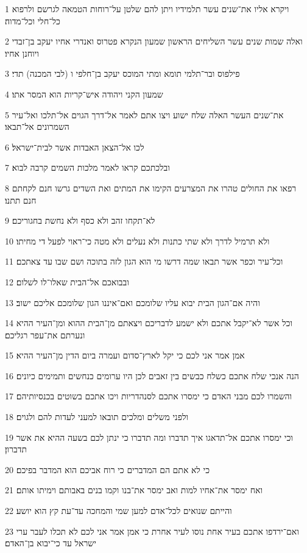 \par 1 ויקרא אליו את־שנים עשר תלמידיו ויתן להם שלטן על־רוחות הטמאה לגרשם ולרפוא כל־חלי וכל־מדוה׃
\par 2 ואלה שמות שנים עשר השליחים הראשון שמעון הנקרא פטרוס ואנדרי אחיו יעקב בן־זבדי ויוחנן אחיו׃
\par 3 פילפוס ובר־תלמי תומא ומתי המוכס יעקב בן־חלפי ו (לבי המכנה) תדי׃
\par 4 שמעון הקני ויהודה איש־קריות הוא המסר אתו׃
\par 5 את־שנים העשר האלה שלח ישוע ויצו אתם לאמר אל־דרך הגוים אל־תלכו ואל־עיר השמרונים אל־תבאו׃
\par 6 לכו אל־הצאן האבדות אשר לבית־ישראל׃
\par 7 ובלכתכם קראו לאמר מלכות השמים קרבה לבוא׃
\par 8 רפאו את החולים טהרו את המצרעים הקימו את המתים ואת השדים גרשו חנם לקחתם חנם תתנו׃
\par 9 לא־תקחו זהב ולא כסף ולא נחשת בחגוריכם׃
\par 10 ולא תרמיל לדרך ולא שתי כתנות ולא נעלים ולא מטה כי־ראוי לפעל די מחיתו׃
\par 11 וכל־עיר וכפר אשר תבאו שמה דרשו מי הוא הגון לזה בתוכה ושם שבו עד צאתכם׃
\par 12 ובבואכם אל־הבית שאלו־לו לשלום׃
\par 13 והיה אם־הגון הבית יבוא עליו שלומכם ואם־איננו הגון שלומכם אליכם ישוב׃
\par 14 וכל אשר לא־יקבל אתכם ולא ישמע לדבריכם ויצאתם מן־הבית ההוא ומן־העיר ההיא ונערתם את־עפר רגליכם׃
\par 15 אמן אמר אני לכם כי יקל לארץ־סדום ועמרה ביום הדין מן־העיר ההיא׃
\par 16 הנה אנכי שלח אתכם כשלח כבשים בין זאבים לכן היו ערומים כנחשים ותמימים כיונים׃
\par 17 והשמרו לכם מבני האדם כי ימסרו אתכם לסנהדריות ויכו אתכם בשוטים בכנסיותיהם׃
\par 18 ולפני משלים ומלכים תובאו למעני לעדות להם ולגוים׃
\par 19 וכי ימסרו אתכם אל־תדאגו איך תדברו ומה תדברו כי ינתן לכם בשעה ההיא את אשר תדברון׃
\par 20 כי לא אתם הם המדברים כי רוח אביכם הוא המדבר בפיכם׃
\par 21 ואח ימסר את־אחיו למות ואב ימסר את־בנו וקמו בנים באבותם וימיתו אותם׃
\par 22 והייתם שנואים לכל־אדם למען שמי והמחכה עד־עת קץ הוא יושע׃
\par 23 ואם־ירדפו אתכם בעיר אחת נוסו לעיר אחרת כי אמן אמר אני לכם לא תכלו לעבר ערי ישראל עד כי־יבוא בן־האדם׃

